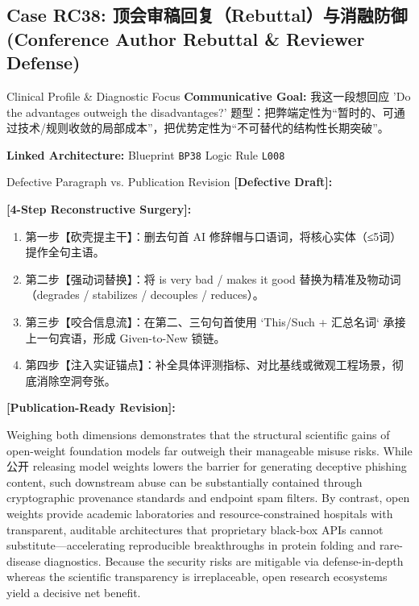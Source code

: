 \subsection{Case RC38: 顶会审稿回复（Rebuttal）与消融防御 (Conference Author Rebuttal \& Reviewer Defense)}\label{case:RC38}
\begin{ConceptBox}{Clinical Profile \& Diagnostic Focus}
\textbf{Communicative Goal:} 我这一段想回应 'Do the advantages outweigh the disadvantages?' 题型：把弊端定性为“暂时的、可通过技术/规则收敛的局部成本”，把优势定性为“不可替代的结构性长期突破”。\par
\textbf{Linked Architecture:} Blueprint \texttt{BP38} \enspace\textbar\enspace Logic Rule \texttt{L008}
\end{ConceptBox}
\begin{ExampleBox}{Defective Paragraph vs. Publication Revision}
\textbf{\color{TargetHighlight}[Defective Draft]:}\par
{}\par\vspace{6pt}
\textbf{\color{AcadForest}[4-Step Reconstructive Surgery]:}
\begin{enumerate}[label=\textbf{\color{AcadNavy}Step \arabic*:}, leftmargin=2em]
  \item 第一步【砍壳提主干】：删去句首 AI 修辞帽与口语词，将核心实体（≤5词）提作全句主语。
  \item 第二步【强动词替换】：将 is very bad / makes it good 替换为精准及物动词（degrades / stabilizes / decouples / reduces）。
  \item 第三步【咬合信息流】：在第二、三句句首使用 `This/Such + 汇总名词` 承接上一句宾语，形成 Given-to-New 锁链。
  \item 第四步【注入实证锚点】：补全具体评测指标、对比基线或微观工程场景，彻底消除空洞夸张。
\end{enumerate}\vspace{4pt}
\textbf{\color{AcadNavy}[Publication-Ready Revision]:}\par
Weighing both dimensions demonstrates that the structural scientific gains of open-weight foundation models far outweigh their manageable misuse risks. While公开 releasing model weights lowers the barrier for generating deceptive phishing content, such downstream abuse can be substantially contained through cryptographic provenance standards and endpoint spam filters. By contrast, open weights provide academic laboratories and resource-constrained hospitals with transparent, auditable architectures that proprietary black-box APIs cannot substitute---accelerating reproducible breakthroughs in protein folding and rare-disease diagnostics. Because the security risks are mitigable via defense-in-depth whereas the scientific transparency is irreplaceable, open research ecosystems yield a decisive net benefit.
\end{ExampleBox}
